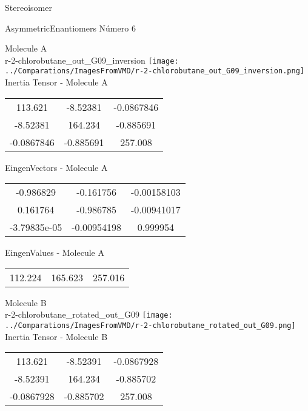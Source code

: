 \begin{center}
\vtab
\vtab
\textcolor{NavyBlue}{\Large Stereoisomer}
\end{center}

 \newpage

\vtab[-2cm]
\begin{center}
{\large AsymmetricEnantiomers \tab Número 6}
\end{center}
\begin{multicols}{2}
\begin{center}

Molecule A \\ 
r-2-chlorobutane\_out\_G09\_inversion
\texttt{[image: ../Comparations/ImagesFromVMD/r-2-chlorobutane\_out\_G09\_inversion.png]}
\\
Inertia Tensor - Molecule A \\
\vtab

\begin{tabular}{|c c c|}
113.621	 & 	-8.52381	 & 	-0.0867846	 \\
-8.52381	 & 	164.234	 & 	-0.885691	 \\
-0.0867846	 & 	-0.885691	 & 	257.008
\end{tabular}

\vtab
 EingenVectors - Molecule A     \\
\vtab
\begin{tabular}{|c c c|}
-0.986829	 & 	-0.161756	 & 	-0.00158103	 \\
0.161764	 & 	-0.986785	 & 	-0.00941017	 \\
-3.79835e-05	 & 	-0.00954198	 & 	0.999954
\end{tabular}

\vtab
 EingenValues - Molecule A     \\
\vtab
\begin{tabular}{|c c c|}
112.224	 & 	165.623	 & 	257.016	 \\
\end{tabular}
\columnbreak

Molecule B \\ 
r-2-chlorobutane\_rotated\_out\_G09
\texttt{[image: ../Comparations/ImagesFromVMD/r-2-chlorobutane\_rotated\_out\_G09.png]}
\\
Inertia Tensor - Molecule B \\
\vtab

\begin{tabular}{|c c c|}
113.621	 & 	-8.52391	 & 	-0.0867928	 \\
-8.52391	 & 	164.234	 & 	-0.885702	 \\
-0.0867928	 & 	-0.885702	 & 	257.008
\end{tabular}


\end{center}
\end{multicols}
